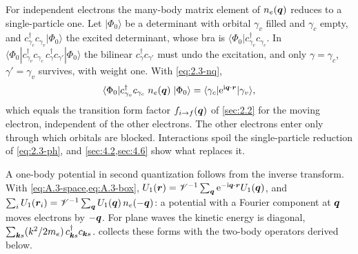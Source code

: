 For independent electrons the many-body matrix element of $n_e(\bm{q})$ reduces to a single-particle one. Let $|\Phi_0\rangle$ be a determinant with orbital $\gamma_v$ filled and $\gamma_c$ empty, and $c^\dagger_{\gamma_c}c_{\gamma_v}|\Phi_0\rangle$ the excited determinant, whose bra is $\langle\Phi_0|c^\dagger_{\gamma_v}c_{\gamma_c}$. In $\langle\Phi_0|c^\dagger_{\gamma_v}c_{\gamma_c}\,c^\dagger_\gamma c_{\gamma'}|\Phi_0\rangle$ the bilinear $c^\dagger_\gamma c_{\gamma'}$ must undo the excitation, and only $\gamma = \gamma_c$, $\gamma' = \gamma_v$ survives, with weight one. With \cref{eq:2.3-nq},
\begin{equation}
  \langle\Phi_0|c^\dagger_{\gamma_v}c_{\gamma_c}\;n_e(\bm{q})\;|\Phi_0\rangle = \langle\gamma_c|\mathrm{e}^{\mathrm{i}\bm{q}\cdot\bm{r}}|\gamma_v\rangle ,
  \label{eq:2.3-ph}
\end{equation}
which equals the transition form factor $f_{i\to f}(\bm{q})$ of \cref{sec:2.2} for the moving electron, independent of the other electrons. The other electrons enter only through which orbitals are blocked. Interactions spoil the single-particle reduction of \cref{eq:2.3-ph}, and \cref{sec:4.2,sec:4.6} show what replaces it.

A one-body potential in second quantization follows from the inverse transform. With \cref{eq:A.3-space,eq:A.3-box}, $U_1(\bm{r}) = \mathscr{V}^{-1}\sum_{\bm{q}}\mathrm{e}^{-\mathrm{i}\bm{q}\cdot\bm{r}}U_1(\bm{q})$, and $\sum_iU_1(\bm{r}_i) = \mathscr{V}^{-1}\sum_{\bm{q}}U_1(\bm{q})\,n_e(-\bm{q})$: a potential with a Fourier component at $\bm{q}$ moves electrons by $-\bm{q}$. For plane waves the kinetic energy is diagonal, $\sum_{\bm{k}s}(k^2/2m_e)\,c^\dagger_{\bm{k}s}c_{\bm{k}s}$.  collects these forms with the two-body operators derived below.

